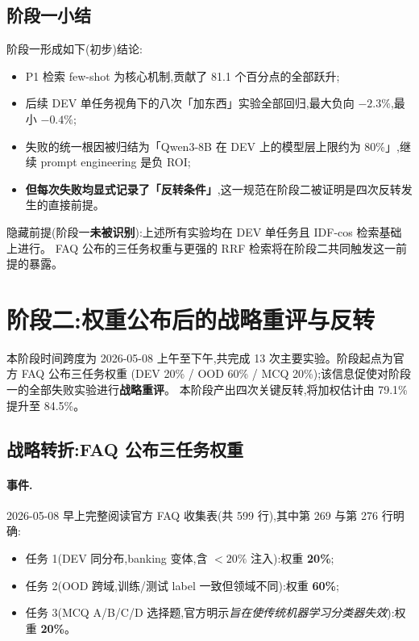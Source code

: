 \documentclass[11pt,a4paper]{ctexart}
\begin{document}
\subsection{阶段一小结}

阶段一形成如下(初步)结论:

\begin{itemize}[leftmargin=2em,itemsep=0.1em]
\item P1 检索 few-shot 为核心机制,贡献了 81.1 个百分点的全部跃升;
\item 后续 DEV 单任务视角下的八次「加东西」实验全部回归,最大负向 $-2.3\%$,最小 $-0.4\%$;
\item 失败的统一根因被归结为「Qwen3-8B 在 DEV 上的模型层上限约为 80\%」,继续 prompt engineering 是负 ROI;
\item \textbf{但每次失败均显式记录了「反转条件」},这一规范在阶段二被证明是四次反转发生的直接前提。
\end{itemize}

\noindent 隐藏前提(阶段一\textbf{未被识别}):上述所有实验均在 DEV 单任务且 IDF-cos 检索基础上进行。
FAQ 公布的三任务权重与更强的 RRF 检索将在阶段二共同触发这一前提的暴露。

\section{阶段二:权重公布后的战略重评与反转}\label{sec:phase2}

本阶段时间跨度为 2026-05-08 上午至下午,共完成 13 次主要实验。阶段起点为官方 FAQ 公布三任务权重
(DEV 20\% / OOD 60\% / MCQ 20\%);该信息促使对阶段一的全部失败实验进行\textbf{战略重评}。
本阶段产出四次关键反转,将加权估计由 79.1\% 提升至 84.5\%。

\subsection{战略转折:FAQ 公布三任务权重}

\paragraph{事件.}2026-05-08 早上完整阅读官方 FAQ 收集表(共 599 行),其中第 269 与第 276 行明确:

\begin{itemize}[leftmargin=2em,itemsep=0.1em]
\item 任务 1(DEV 同分布,banking 变体,含 $<20\%$ 注入):权重 \textbf{20\%};
\item 任务 2(OOD 跨域,训练/测试 label 一致但领域不同):权重 \textbf{60\%};
\item 任务 3(MCQ A/B/C/D 选择题,官方明示\textit{旨在使传统机器学习分类器失效}):权重 \textbf{20\%}。
\end{itemize}
\end{document}
